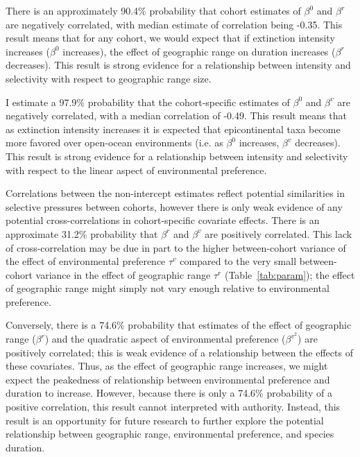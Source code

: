 \documentclass[11pt]{article}
\begin{document}
There is an approximately 90.4\% probability that cohort estimates of \(\beta^{0}\) and \(\beta^{r}\) are negatively correlated, with median estimate of correlation being -0.35. This result means that for any cohort, we would expect that if extinction intensity increases (\(\beta^{0}\) increases), the effect of geographic range on duration increases (\(\beta^{r}\) decreases). This result is strong evidence for a relationship between intensity and selectivity with respect to geographic range size.

I estimate a 97.9\% probability that the cohort-specific estimates of \(\beta^{0}\) and \(\beta^{v}\) are negatively correlated, with a median correlation of -0.49. This result means that as extinction intensity increases it is expected that epicontinental taxa become more favored over open-ocean environments (i.e. as \(\beta^{0}\) increases, \(\beta^{v}\) decreases). This result is strong evidence for a relationship between intensity and selectivity with respect to the linear aspect of environmental preference. 

Correlations between the non-intercept estimates reflect potential similarities in selective pressures between cohorts, however there is only weak evidence of any potential cross-correlations in cohort-specific covariate effects. There is an approximate 31.2\% probability that \(\beta^{r}\) and \(\beta^{v}\) are positively correlated. This lack of cross-correlation may be due in part to the higher between-cohort variance of the effect of environmental preference \(\tau^{v}\) compared to the very small between-cohort variance in the effect of geographic range \(\tau^{r}\) (Table~\ref{tab:param}); the effect of geographic range might simply not vary enough relative to environmental preference. 

Conversely, there is a 74.6\% probability that estimates of the effect of geographic range (\(\beta^{r}\)) and the quadratic aspect of environmental preference (\(\beta^{v^{2}}\)) are positively correlated; this is weak evidence of a relationship between the effects of these covariates. Thus, as the effect of geographic range increases, we might expect the peakedness of relationship between environmental preference and duration to increase. However, because there is only a 74.6\% probability of a positive correlation, this result cannot interpreted with authority. Instead, this result is an opportunity for future research to further explore the potential relationship between geographic range, environmental preference, and species duration.
\end{document}
